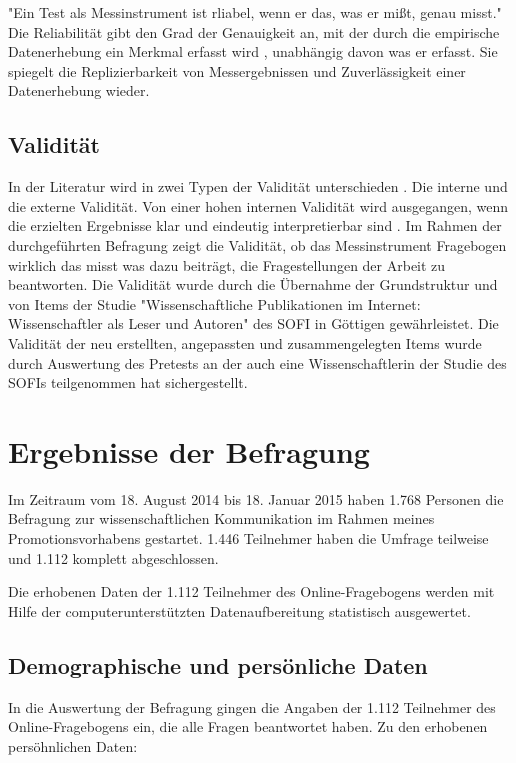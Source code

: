 "Ein Test als Messinstrument ist rliabel, wenn er das, was er mißt, genau misst." \cite{schelten_1997_testbeurteilung} Die Reliabilität gibt den Grad der Genauigkeit an, mit der durch die empirische Datenerhebung ein Merkmal erfasst wird \cite{rost_2004_lehrbuch}, unabhängig davon was er erfasst. Sie spiegelt die Replizierbarkeit von Messergebnissen und Zuverlässigkeit einer Datenerhebung wieder.

\subsection{Validität}
In der Literatur wird in zwei Typen der Validität unterschieden \cite{rost_2004_lehrbuch}. Die interne und die externe Validität. Von einer hohen internen Validität wird ausgegangen, wenn die erzielten Ergebnisse klar und eindeutig interpretierbar sind \cite{raab_2012_fragebogen}. Im Rahmen der durchgeführten Befragung zeigt die Validität, ob das Messinstrument Fragebogen wirklich das misst was dazu beiträgt, die Fragestellungen der Arbeit zu beantworten. Die Validität wurde durch die Übernahme der Grundstruktur und von Items der Studie "Wissenschaftliche Publikationen im Internet: Wissenschaftler als Leser und Autoren" des SOFI in Göttigen gewährleistet. Die Validität der neu erstellten, angepassten  und zusammengelegten Items wurde durch Auswertung des Pretests an der auch eine Wissenschaftlerin der Studie des SOFIs teilgenommen hat sichergestellt.

\section{Ergebnisse der Befragung}

Im Zeitraum vom 18. August 2014 bis 18. Januar 2015 haben 1.768 Personen die Befragung zur wissenschaftlichen Kommunikation im Rahmen meines Promotionsvorhabens gestartet. 1.446 Teilnehmer haben die Umfrage teilweise und 1.112 komplett abgeschlossen.

Die erhobenen Daten der 1.112 Teilnehmer des Online-Fragebogens werden mit Hilfe der computerunterstützten Datenaufbereitung statistisch ausgewertet.

\subsection{Demographische und persönliche Daten}

In die Auswertung der Befragung gingen die Angaben der 1.112 Teilnehmer des Online-Fragebogens ein, die alle Fragen beantwortet haben. Zu den erhobenen persöhnlichen Daten:


